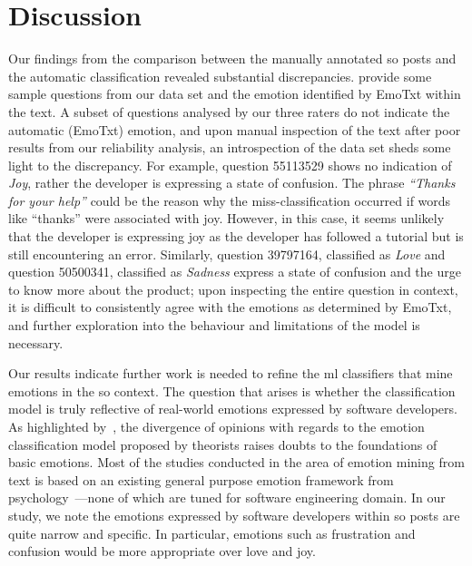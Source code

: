 \section{Discussion}\label{semotion2020:sec:discussion}

Our findings from the comparison between the manually annotated \gls{so} posts and the automatic classification revealed substantial discrepancies.  provide some sample questions from our data set and the emotion identified by EmoTxt within the text. A subset of questions analysed by our three raters do not indicate the automatic (EmoTxt) emotion, and upon manual inspection of the text after poor results from our reliability analysis, an introspection of the data set sheds some light to the discrepancy. For example, question 55113529 shows no indication of \textit{Joy}, rather the developer is expressing a state of confusion. The phrase \textit{``Thanks for your help''} could be the reason why the miss-classification occurred if words like ``thanks'' were associated with joy. However, in this case, it seems unlikely that the developer is expressing joy as the developer has followed a tutorial but is still encountering an error. Similarly, question 39797164, classified as \textit{Love} and question 50500341, classified as \textit{Sadness} express a state of confusion and the urge to know more about the product; upon inspecting the entire question in context, it is difficult to consistently agree with the emotions as determined by EmoTxt, and further exploration into the behaviour and limitations of the model is necessary.

Our results indicate further work is needed to refine the \gls{ml} classifiers that mine emotions in the \gls{so} context. The question that arises is whether the classification model is truly reflective of real-world emotions expressed by software developers. As highlighted by~\citet{curumsing2017}, the divergence of opinions with regards to the emotion classification model proposed by theorists raises doubts to the foundations of basic emotions. Most of the studies conducted in the area of emotion mining from text is based on an existing general purpose emotion framework from psychology~\citep{Ondrej:2016, ortu2016, novielli2018}---none of which are tuned for software engineering domain. In our study, we note the emotions expressed by software developers within \gls{so} posts are quite narrow and specific. In particular, emotions such as frustration and confusion would be more appropriate over love and joy. 

